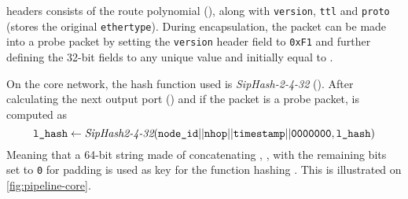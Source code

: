 \polka headers consists of the route polynomial (\routeid), along with \texttt{version}, \texttt{ttl} and \texttt{proto} (stores the original \texttt{ethertype}).
During encapsulation, the packet can be made into a probe packet by setting the \texttt{version} header field to \texttt{0xF1} and further defining the 32-bit fields \timestamp to any unique value and \lhash initially equal to \timestamp.

On the core network, the hash function used is \textit{SipHash-2-4-32}\cite{siphash} (\siphash). 
After calculating the next output port (\nhop) and if the packet is a probe packet, \lhash is computed as
$$
\texttt{l\_hash} \leftarrow \textit{SipHash2-4-32}(\texttt{node\_id} || \texttt{nhop} || \texttt{timestamp} || \texttt{0000000}, \texttt{l\_hash})
$$
Meaning that a 64-bit string made of concatenating \nodeid, \nhop, \timestamp with the remaining bits set to \texttt{0} for padding is used as key for the \siphash function hashing \lhash. This is illustrated on \autoref{fig:pipeline-core}.
